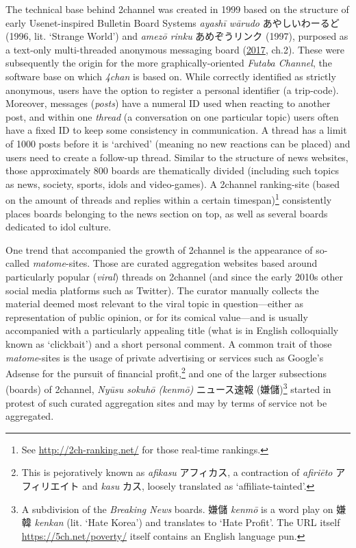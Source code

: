 \documentclass[10pt,british,A4paper,twoside]{memoir}
\begin{document}
The technical base behind 2channel was created in 1999 based on the
structure of early Usenet-inspired Bulletin Board Systems \emph{ayashī
wārudo} あやしいわーるど (1996, lit. `Strange World') and \emph{amezō
rinku} あめぞうリンク (1997), purposed as a text-only multi-threaded
anonymous messaging board
(\protect\hyperlink{ref-barubora_eng:_2017}{2017}, ch.2). These were
subsequently the origin for the more graphically-oriented \emph{Futaba
Channel}, the software base on which \emph{4chan} is based on. While
correctly identified as strictly anonymous, users have the option to
register a personal identifier (a trip-code). Moreover, messages
(\emph{posts}) have a numeral ID used when reacting to another post, and
within one \emph{thread} (a conversation on one particular topic) users
often have a fixed ID to keep some consistency in communication. A
thread has a limit of 1000 posts before it is `archived' (meaning no new
reactions can be placed) and users need to create a follow-up thread.
Similar to the structure of news websites, those approximately 800
boards are thematically divided (including such topics as news, society,
sports, idols and video-games). A 2channel ranking-site (based on the
amount of threads and replies within a certain timespan)\footnote{See
  \url{http://2ch-ranking.net/} for those real-time rankings.}
consistently places boards belonging to the news section on top, as well
as several boards dedicated to idol culture.

One trend that accompanied the growth of 2channel is the appearance of
so-called \emph{matome}-sites. Those are curated aggregation websites
based around particularly popular (\emph{viral}) threads on 2channel
(and since the early 2010s other social media platforms such as
Twitter). The curator manually collects the material deemed most
relevant to the viral topic in question---either as representation of
public opinion, or for its comical value---and is usually accompanied
with a particularly appealing title (what is in English colloquially
known as `clickbait') and a short personal comment. A common trait of
those \emph{matome}-sites is the usage of private advertising or
services such as Google's Adsense for the pursuit of financial
profit,\footnote{This is pejoratively known as \emph{afikasu}
  アフィカス, a contraction of \emph{afiriēto} アフィリエイト and
  \emph{kasu} カス, loosely translated as `affiliate-tainted'.} and one
of the larger subsections (boards) of 2channel, \emph{Nyūsu sokuhō
(kenmō)} ニュース速報 (嫌儲)\footnote{A subdivision of the
  \emph{Breaking News} boards. 嫌儲 \emph{kenmō} is a word play on 嫌韓
  \emph{kenkan} (lit. `Hate Korea') and translates to `Hate Profit'. The
  URL itself \url{https://5ch.net/poverty/} itself contains an English
  language pun.} started in protest of such curated aggregation sites
and may by terms of service not be aggregated.
\end{document}

